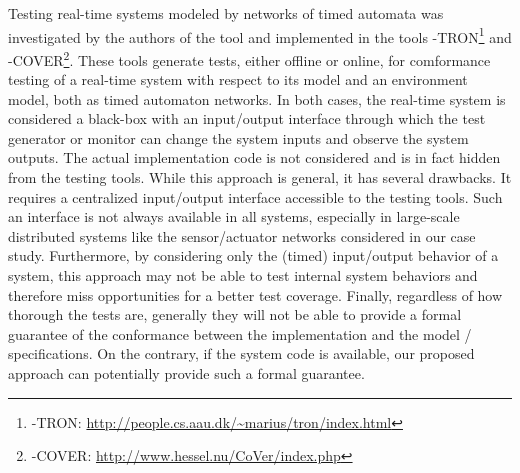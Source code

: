 Testing real-time systems modeled by networks of timed automata was
investigated by the authors of the tool \uppaal
\cite{uppaaltron2008,uppaalcover2007,uppaaltron2005} and implemented
in the tools \uppaal-TRON\footnote{\uppaal-TRON:
  \url{http://people.cs.aau.dk/~marius/tron/index.html}} and
\uppaal-COVER\footnote{\uppaal-COVER:
  \url{http://www.hessel.nu/CoVer/index.php}}.  These tools generate
tests, either offline or online, for comformance testing of a
real-time system with respect to its model and an environment model,
both as timed automaton networks.  In both cases, the real-time system
is considered a black-box with an input/output interface through which
the test generator or monitor can change the system inputs and observe
the system outputs.  The actual implementation code is not considered
and is in fact hidden from the testing tools.  While this approach is
general, it has several drawbacks.  It requires a centralized
input/output interface accessible to the testing tools.  Such an
interface is not always available in all systems, especially in
large-scale distributed systems like the sensor/actuator networks
considered in our case study.  Furthermore, by considering only the
(timed) input/output behavior of a system, this approach may not be
able to test internal system behaviors and therefore miss
opportunities for a better test
coverage.  %
Finally, regardless of how thorough the tests are, generally they will
not be able to provide a formal guarantee of the conformance between
the implementation and the model / specifications.  On the contrary,
if the system code is available, our proposed
approach can potentially provide such a
formal guarantee.



